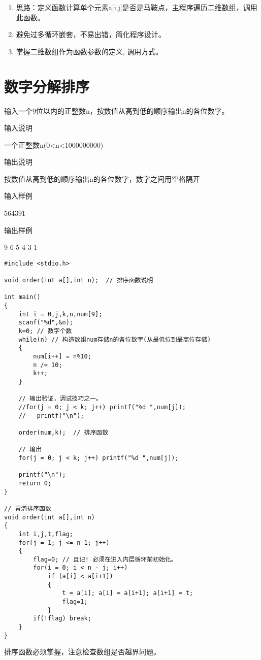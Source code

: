 \begin{note}[要点]
\begin{enumerate}
\item 思路：定义函数计算单个元素a[i,j]是否是马鞍点，主程序遍历二维数组，调用此函数。
\item 避免过多循环嵌套，不易出错，简化程序设计。
\item 掌握二维数组作为函数参数的定义, 调用方式。
\end{enumerate}
\end{note}

\section{数字分解排序}
输入一个9位以内的正整数n，按数值从高到低的顺序输出n的各位数字。

输入说明	

一个正整数n(0<n<1000000000)

输出说明	

按数值从高到低的顺序输出n的各位数字，数字之间用空格隔开

输入样例	

564391

输出样例

9 6 5 4 3 1

\begin{lstlisting}
#include <stdio.h>

void order(int a[],int n);  // 排序函数说明

int main()
{
	int i = 0,j,k,n,num[9];
	scanf("%d",&n);
	k=0; // 数字个数 
	while(n) // 构造数组num存储n的各位数字(从最低位到最高位存储)
	{
		num[i++] = n%10;
		n /= 10;
		k++;
	} 

	// 输出验证，调试技巧之一。 
	//for(j = 0; j < k; j++) printf("%d ",num[j]);
	//   printf("\n");
	
	order(num,k);  // 排序函数
	
	// 输出
	for(j = 0; j < k; j++) printf("%d ",num[j]);
	
	printf("\n");
	return 0;
} 

// 冒泡排序函数 
void order(int a[],int n)
{ 
	int i,j,t,flag; 
	for(j = 1; j <= n-1; j++)
	{ 
		flag=0; // 且记! 必须在进入内层循环前初始化。
		for(i = 0; i < n - j; i++)
			if (a[i] < a[i+1]) 
			{ 
				t = a[i]; a[i] = a[i+1]; a[i+1] = t; 
				flag=1;
			}
		if(!flag) break;
	}
}
\end{lstlisting}

\begin{note}[要点]
排序函数必须掌握，注意检查数组是否越界问题。
\end{note}




